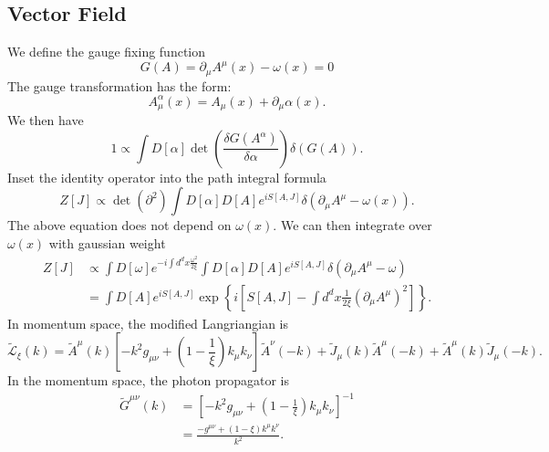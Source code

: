 \subsection{Vector Field}
We define the gauge fixing function
\begin{equation*}
	G(A) = \partial_\mu A^\mu(x) -\omega(x) = 0
\end{equation*}
The gauge transformation has the form:
\begin{equation*}
	A^\alpha_\mu(x) = A_\mu(x) + \partial_\mu \alpha(x).
\end{equation*}
We then have
\begin{equation*}
	1 \propto \int D[\alpha] \det\left(\frac{\delta G(A^\alpha)}{\delta \alpha}\right) \delta(G(A)).
\end{equation*}
Inset the identity operator into the path integral formula
\begin{equation*}
	Z[J] \propto \det\left(\partial^2 \right) \int D[\alpha]D[A] e^{iS[A,J]} \delta(\partial_\mu A^\mu -\omega(x)).
\end{equation*}
The above equation does not depend on $\omega(x)$.
We can then integrate over $\omega(x)$ with gaussian weight
\begin{equation*}
\begin{aligned}
	Z[J] &\propto \int D[\omega] e^{-i\int d^d x \frac{\omega^2}{2\xi}} \int D[\alpha]D[A] e^{iS[A,J]}
	\delta(\partial_\mu A^\mu-\omega) \\
	&= \int D[A] e^{iS[A,J]} \exp\left\{i \left[S[A,J]-\int d^d x \frac{1}{2\xi}(\partial_\mu A^\mu)^2 \right]\right\}.
\end{aligned}
\end{equation*}
In momentum space, the modified Langriangian is 
\begin{equation*}
	\tilde{\mathcal{L}}_\xi(k) = \tilde{A}^\mu(k)\left[
		-k^2 g_{\mu\nu}+\left(1-\frac{1}{\xi}\right)k_\mu k_\nu
		\right] \tilde{A}^\nu(-k) +
		\tilde{J}_\mu(k) \tilde{A}^\mu(-k) +
		\tilde{A}^\mu(k) \tilde{J}_\mu(-k).
\end{equation*}
In the momentum space, the photon propagator is
\begin{equation}\label{eq:qft-photon-momentum-propagator}
\begin{aligned}
	\tilde G^{\mu\nu}(k) 
	&= \left[-k^2 g_{\mu\nu}+\left(1-\frac{1}{\xi}\right)k_\mu k_\nu\right]^{-1} \\
	&= \frac{-g^{\mu\nu}+(1-\xi)k^\mu k^\nu}{k^2}.
\end{aligned}
\end{equation}
